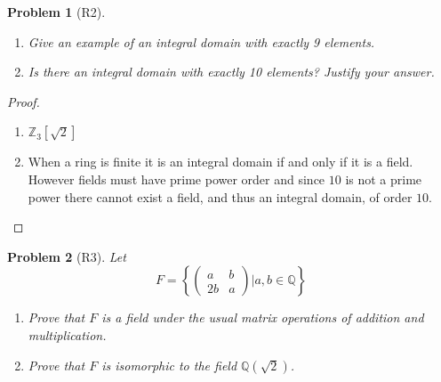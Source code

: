 \documentclass[10pt]{article}
\newcommand{\sk}{\vskip 10mm}
\newcommand{\bb}[1]{\mathbb{#1}}
\theoremstyle{plain}
\newtheorem{problem}{Problem}
\theoremstyle{remark}
\begin{document}
\sk

\begin{problem}[R2]
  \begin{enumerate}
  \item Give an example of an integral domain with exactly 9 elements.
  \item Is there an integral domain with exactly 10 elements? Justify
    your answer.
  \end{enumerate}
\end{problem}

\begin{proof}
  \begin{enumerate}
  \item $\bb{Z}_3[\sqrt{2}]$
  \item When a ring is finite it is an integral domain if and only if it is
    a field. However fields must have prime power order and since $10$ is not
    a prime power there cannot exist a field, and thus an integral domain, of
    order $10$.
  \end{enumerate}
\end{proof}

\sk

\begin{problem}[R3]
  Let
  \[
    F =
    \left\{\left(
        \begin{array}{cc}
          a&b\\
          2b&a
        \end{array}
      \right)| a,b\in \bb{Q}\right\}
  \]
  \begin{enumerate}
  \item Prove that $F$ is a field under the usual matrix operations of addition
    and multiplication.
  \item Prove that $F$ is isomorphic to the field $\bb{Q}(\sqrt{2})$.
  \end{enumerate}
\end{problem}
\end{document}
